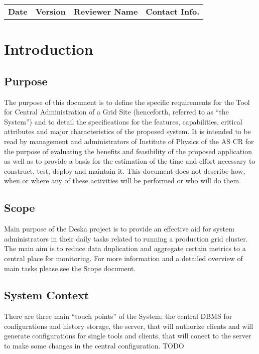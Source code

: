 \documentclass[12pt]{article}
\begin{document}
\begin{table}[!h]
	\begin{tabular}{l l l l}
		\textbf{Date} & \textbf{Version} & \textbf{Reviewer Name} & \textbf{Contact Info.} \\
	\end{tabular}
	\label{tab:DocumentApproval}
\end{table}


\newpage

\tableofcontents

\newpage

\section{Introduction}

\subsection{Purpose}
The purpose of this document is to define the specific requirements for the Tool for Central Administration of a Grid Site 
(henceforth, referred to as ``the System'') and to detail the specifications for the features, capabilities, critical attributes 
and major characteristics of the proposed system. It is intended to be read by management and administrators of Institute of 
Physics of the AS CR for the purpose of evaluating the benefits and feasibility of the proposed application as well as to provide 
a basis for the estimation of the time and effort necessary to construct, test, deploy and maintain it. This document does not 
describe how, when or where any of these activities will be performed or who will do them.

\subsection{Scope}
Main purpose of the Deska project is to provide an effective aid for system
administrators in their daily tasks related to running a production grid
cluster.  The main aim is to reduce data duplication and aggregate certain
metrics to a central place for monitoring.  For more information and a detailed
overview of main tasks please see the Scope document.

\subsection{System Context}
There are three main ``touch points'' of the System: the central DBMS for configurations and history storage, the server, 
that will authorize clients and will generate configurations for single tools and clients, that will conect to the server to make some 
changes in the central configuration. TODO
\end{document}
